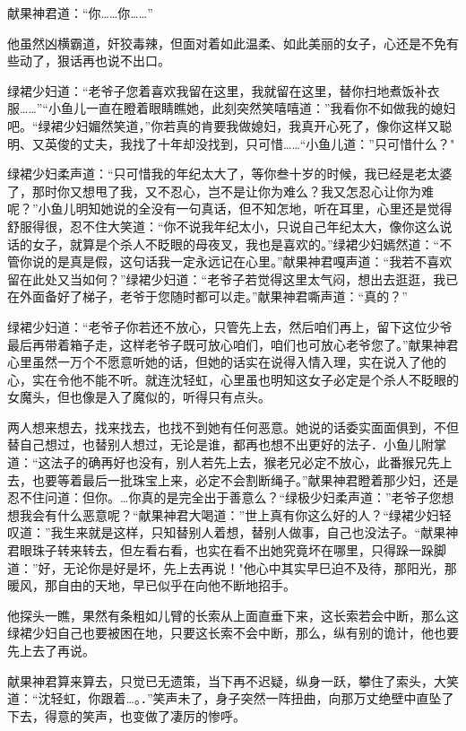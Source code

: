 \documentclass[12pt,oneside]{book}
\begin{document}
献果神君道：``你\ldots\ldots 你\ldots\ldots{}''

他虽然凶横霸道，奸狡毒辣，但面对着如此温柔、如此美丽的女子，心还是不免有些动了，狠话再也说不出口。

绿裙少妇道：``老爷子您着喜欢我留在这里，我就留在这里，替你扫地煮饭补衣服\ldots\ldots{}''``小鱼儿一直在瞪着眼睛瞧她，此刻突然笑嘻嘻道：''我看你不如做我的媳妇吧。``绿裙少妇媚然笑道，''你若真的肯要我做媳妇，我真开心死了，像你这样又聪明、又英俊的丈夫，我找了十年却没找到，只可惜\ldots\ldots{}``小鱼儿道：''只可惜什么？"

绿裙少妇柔声道：``只可惜我的年纪太大了，等你叁十岁的时候，我已经是老太婆了，那时你又想甩了我，又不忍心，岂不是让你为难么？我又怎忍心让你为难呢？''小鱼儿明知她说的全没有一句真话，但不知怎地，听在耳里，心里还是觉得舒服得很，忍不住大笑道：``你不说我年纪太小，只说自己年纪太大，像你这么说话的女子，就算是个杀人不眨眼的母夜叉，我也是喜欢的。''绿裙少妇嫣然道：``不管你说的是真是假，这句话我一定永远记在心里。''献果神君嘎声道：``我若不喜欢留在此处又当如何？''绿裙少妇道：``老爷子若觉得这里太气闷，想出去逛逛，我已在外面备好了梯子，老爷于您随时都可以走。''献果神君嘶声道：``真的？''

绿裙少妇道：``老爷子你若还不放心，只管先上去，然后咱们再上，留下这位少爷最后再带着箱子走，这样老爷子既可放心咱们，咱们也可放心老爷您了。''献果神君心里虽然一万个不愿意听她的话，但她的话实在说得入情入理，实在说入了他的心，实在令他不能不听。就连沈轻虹，心里虽也明知这女子必定是个杀人不眨眼的女魔头，但也像是入了魔似的，听得只有点头。

两人想来想去，找来找去，也找不到她有任何恶意。她说的话委实面面俱到，不但替自己想过，也替别人想过，无论是谁，都再也想不出更好的法子．小鱼儿附掌道：``这法子的确再好也没有，别人若先上去，猴老兄必定不放心，此番猴兄先上去，也要等着最后一批珠宝上来，必定不会割断绳子。''献果神君瞪着那少妇，还是忍不住问道：但你。\ldots 你真的是完全出于善意么？``绿极少妇柔声道：''老爷子您想想我会有什么恶意呢？``献果神君大喝道：''世上真有你这么好的人？``绿裙少妇轻叹道：''我生来就是这样，只知替别人着想，替别人做事，自己也没法子。``献果神君眼珠子转来转去，但左看右看，也实在看不出她究竟坏在哪里，只得跺一跺脚道：''好，无论你是好是坏，先上去再说！"他心中其实早巳迫不及待，那阳光，那暖风，那自由的天地，早已似乎在向他不断地招手。

他探头一瞧，果然有条粗如儿臂的长索从上面直垂下来，这长索若会中断，那么这绿裙少妇自己也要被困在地，只要这长索不会中断，那么，纵有别的诡计，他也要先上去了再说。

献果神君算来算去，只觉已无遗策，当下再不迟疑，纵身一跃，攀住了索头，大笑道：``沈轻虹，你跟着\ldots。．''笑声未了，身子突然一阵扭曲，向那万丈绝壁中直坠了下去，得意的笑声，也变做了凄厉的惨呼。
\end{document}

